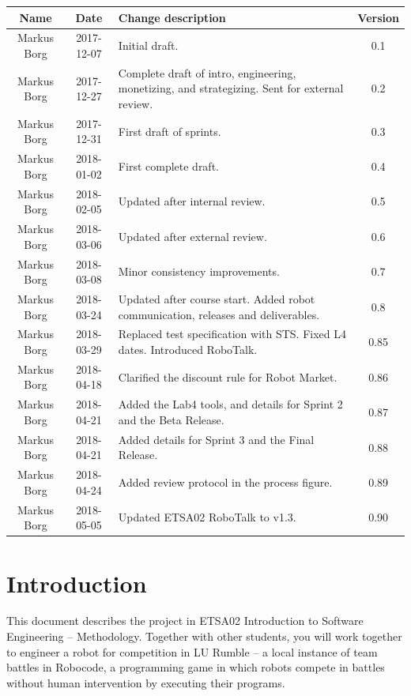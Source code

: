 \documentclass{scrreprt}
\begin{document}
\begin{center}
    \begin{tabular}{|c|c|p{8cm}|c|}
        \hline
	    Name & Date & Change description & Version\\
        \hline
	    Markus Borg & 2017-12-07 & Initial draft. & 0.1\\
        \hline
        Markus Borg & 2017-12-27 & Complete draft of intro, engineering, monetizing, and strategizing. Sent for external review. & 0.2\\
        \hline
        Markus Borg & 2017-12-31 & First draft of sprints. & 0.3\\
        \hline
        Markus Borg & 2018-01-02 & First complete draft. & 0.4\\
        \hline
        Markus Borg & 2018-02-05 & Updated after internal review. & 0.5\\
        \hline
        Markus Borg & 2018-03-06 & Updated after external review. & 0.6\\
        \hline
        Markus Borg & 2018-03-08 & Minor consistency improvements. & 0.7\\
        \hline
        Markus Borg & 2018-03-24 & Updated after course start. Added robot communication, releases and deliverables. & 0.8\\
        \hline
        Markus Borg & 2018-03-29 & Replaced test specification with STS. Fixed L4 dates. Introduced RoboTalk. & 0.85\\
        \hline
        Markus Borg & 2018-04-18 & Clarified the discount rule for Robot Market. & 0.86\\
        \hline
        Markus Borg & 2018-04-21 & Added the Lab4 tools, and details for Sprint 2 and the Beta Release. & 0.87\\
        \hline
        Markus Borg & 2018-04-21 & Added details for Sprint 3 and the Final Release. & 0.88\\
        \hline
        Markus Borg & 2018-04-24 & Added review protocol in the process figure. & 0.89\\
        \hline
        Markus Borg & 2018-05-05 & Updated ETSA02 RoboTalk to v1.3. & 0.90\\
        \hline
    \end{tabular}
\end{center}

\chapter{Introduction}
This document describes the project in ETSA02 Introduction to Software Engineering -- Methodology. Together with other students, you will work together to engineer a robot for competition in LU Rumble -- a local instance of team battles in Robocode, a programming game in which robots compete in battles without human intervention by executing their programs.
\end{document}
